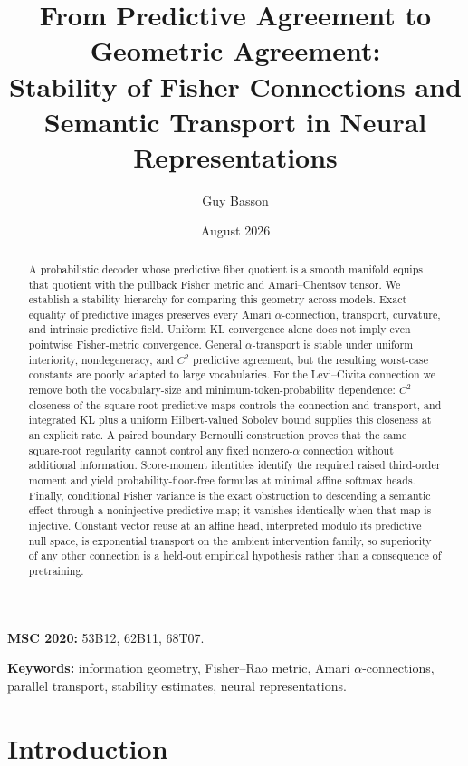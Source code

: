 \documentclass[11pt]{article}
\title{From Predictive Agreement to Geometric Agreement:\\
Stability of Fisher Connections and Semantic Transport in Neural Representations}
\author{Guy Basson}
\date{August 2026}
\theoremstyle{definition}
\theoremstyle{remark}
\begin{document}
\maketitle

\begin{abstract}
A probabilistic decoder whose predictive fiber quotient is a smooth manifold
equips that quotient with the pullback Fisher metric and Amari--Chentsov tensor.
We establish a stability hierarchy for comparing this geometry across models.
Exact equality of predictive images preserves every Amari $\alpha$-connection,
transport, curvature, and intrinsic predictive field. Uniform KL convergence
alone does not imply even pointwise Fisher-metric convergence. General
$\alpha$-transport is stable under uniform interiority, nondegeneracy, and
$C^2$ predictive agreement, but the resulting worst-case constants are poorly
adapted to large vocabularies. For the Levi--Civita connection we remove both
the vocabulary-size and minimum-token-probability dependence: $C^2$ closeness
of the square-root predictive maps controls the connection and transport, and
integrated KL plus a uniform Hilbert-valued Sobolev bound supplies this
closeness at an explicit rate. A paired boundary Bernoulli construction proves
that the same square-root regularity cannot control any fixed nonzero-$\alpha$
connection without additional information. Score-moment identities identify
the required raised third-order moment and yield probability-floor-free
formulas at minimal affine softmax heads. Finally, conditional Fisher variance
is the exact obstruction to descending a semantic effect through a
noninjective predictive map; it vanishes identically when that map is
injective. Constant vector reuse at an affine head, interpreted modulo its
predictive null space, is exponential transport on the ambient intervention
family, so superiority of any other connection is a held-out empirical
hypothesis rather than a consequence of pretraining.
\end{abstract}

\medskip
\noindent\textbf{MSC 2020:} 53B12, 62B11, 68T07.

\smallskip
\noindent\textbf{Keywords:} information geometry, Fisher--Rao metric, Amari $\alpha$-connections, parallel transport, stability estimates, neural representations.

\section{Introduction}
\end{document}
